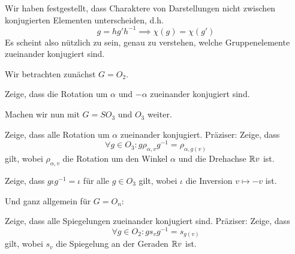 \begin{sheet}

\begin{problem}[title={Konjugation in orthogonalen Gruppen}]
Wir haben festgestellt, dass Charaktere von Darstellungen nicht zwischen konjugierten Elementen unterscheiden, d.h.
\[ g=hg'h^{-1} \implies \chi(g) = \chi(g') \]
Es scheint also nützlich zu sein, genau zu verstehen, welche Gruppenelemente zueinander konjugiert sind.

Wir betrachten zunächst $G=O_2$.
\begin{subproblem}
Zeige, dass die Rotation um $\alpha$ und $-\alpha$ zueinander konjugiert sind.
\end{subproblem}

Machen wir nun mit $G=SO_3$ und $O_3$ weiter.
\begin{subproblem}
Zeige, dass alle Rotation um $\alpha$ zueinander konjugiert. Präziser: Zeige, dass
\[\forall g\in O_3: g\rho_{\alpha,v}g^{-1} = \rho_{\alpha,g(v)} \]
gilt, wobei $\rho_{\alpha,v}$ die Rotation um den Winkel $\alpha$ und die Drehachse $\mathbb{R} v$ ist.
\end{subproblem}
\begin{subproblem}
Zeige, dass $g\iota g^{-1}=\iota$ für alle $g\in O_3$ gilt, wobei $\iota$ die Inversion $v\mapsto -v$ ist.
\end{subproblem}

Und ganz allgemein für $G=O_n$:
\begin{subproblem}
Zeige, dass alle Spiegelungen zueinander konjugiert sind. Präziser: Zeige, dass
\[\forall g\in O_2: gs_vg^{-1} = s_{g(v)}\]
gilt, wobei $s_v$ die Spiegelung an der Geraden $\mathbb{R} v$ ist.
\end{subproblem}
\end{problem}

\end{sheet}